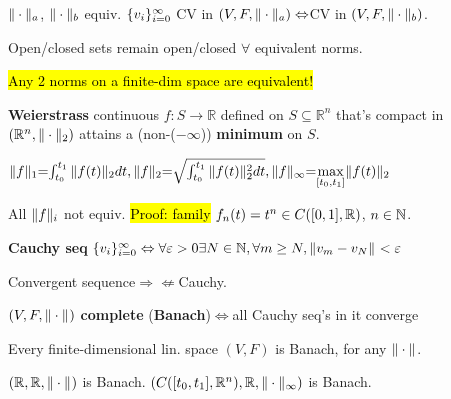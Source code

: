 \begin{Fact}
$\|\cdot\|_{a}$, $\|\cdot\|_{b}$ equiv. $\{v_{i}\}_{i=0}^{\infty}$ CV in $(V,F,\|\cdot\|_{a})\Leftrightarrow$CV in $(V,F,\|\cdot\|_{b})$.
\end{Fact}
\begin{Fact}
Open/closed sets remain open/closed $\forall$ equivalent norms.
\end{Fact}
\begin{Theorem}
\hl{Any 2 norms on a finite-dim space are equivalent!}
\end{Theorem}
\begin{Fact}
\textbf{Weierstrass} continuous $f:S\to\mathbb R$ defined on $S\subseteq\mathbb R^n$ that's compact in $(\mathbb R^n,\|\cdot\|_{2})$ attains a (non-($-\infty$)) \textbf{minimum} on $S$.
\end{Fact}
\begin{center}
$
{
\|f\|_{1}\hspace{-1mm}=\hspace{-1mm}\int_{t_0}^{t_1}\|f(t)\|_{2}dt
,
\|f\|_{2}\hspace{-1mm}=\hspace{-1mm}\sqrt{\int_{t_0}^{t_1}\|f(t)\|_{2}^2dt}
,
\|f\|_{\infty}\hspace{-1mm}=\hspace{-1mm}\underset{[t_0,t_1]}{\max}\|f(t)\|_{2}
}
$
\end{center}
All $\|f\|_{i}$ not equiv. \hl{Proof: family} $f_n(t)=t^n\in C([0,1],\mathbb R)$, $n\in\mathbb N$.

\begin{Definition}
\textbf{Cauchy seq} $\{v_{i}\}_{i=0}^{\infty}\Leftrightarrow\forall\varepsilon>0\exists N\in\mathbb N,\forall m\ge N,\|v_m-v_N\|_{}<\varepsilon$
\end{Definition}
\begin{Fact}
Convergent sequence$\Rightarrow\nLeftarrow$Cauchy.
\end{Fact}
\begin{Definition}
$(V,F,\|\cdot\|_{})$ \textbf{complete} (\textbf{Banach})$\Leftrightarrow$all Cauchy seq's in it converge
\end{Definition}
\begin{Theorem}
Every finite-dimensional lin. space $(V,F)$ is Banach, for any $\|\cdot\|_{}$.
\end{Theorem}
$(\mathbb R,\mathbb R,\|\cdot\|_{})$ is Banach. $(C([t_0,t_1],\mathbb R^n),\mathbb R,\|\cdot\|_{\infty})$ is Banach.

